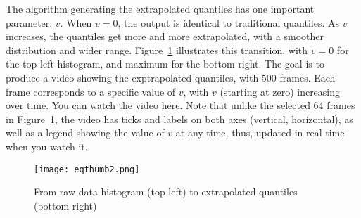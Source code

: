 \documentclass[oneside,10pt]{book}
\begin{document}
The algorithm generating  the extrapolated quantiles has one important parameter: $v$. When $v=0$, the output is
 identical to traditional quantiles. As $v$ increases, the quantiles get more and more extrapolated, with a smoother distribution
 and wider range. Figure~\ref{ringersap} illustrates this transition, with $v=0$ for the top left histogram, and maximum for the bottom right.
 The goal is to produce a video showing the exptrapolated quantiles, with 500 frames. Each frame corresponds to a specific value of $v$, with $v$ (starting at zero) increasing over time. You can watch the video \href{https://mltechniques.com/2023/11/26/easy-trick-to-debias-genai-models-quantile-convolution/}{here}. Note that unlike the selected 64 frames in Figure~\ref{ringersap}, the video has ticks and labels on both axes (vertical, horizontal), as well as a legend showing the value of $v$ at any time, thus, updated in real time when you watch it.

\begin{figure}[H]
\centering
\texttt{[image: eqthumb2.png]}   
\caption{From raw data histogram (top left) to extrapolated quantiles (bottom right)}
\label{ringersap}
\end{figure}
\end{document}
